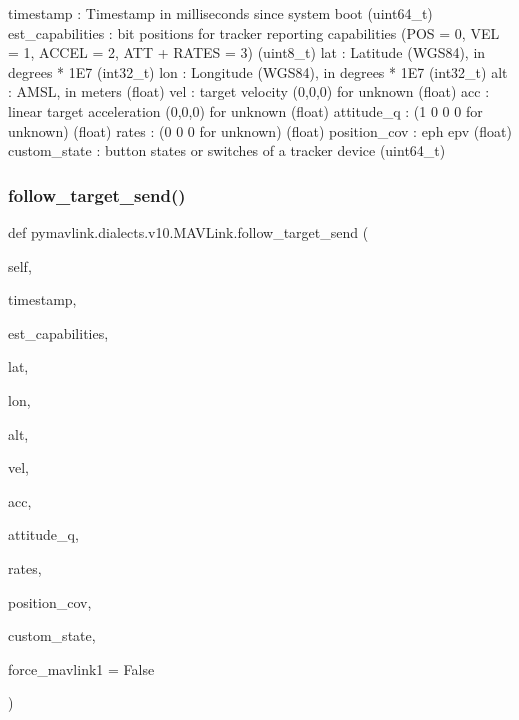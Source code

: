 \begin{DoxyVerb}
\begin{DoxyVerb}
\begin{DoxyVerb}
timestamp                 : Timestamp in milliseconds since system boot (uint64_t)
est_capabilities          : bit positions for tracker reporting capabilities (POS = 0, VEL = 1, ACCEL = 2, ATT + RATES = 3) (uint8_t)
lat                       : Latitude (WGS84), in degrees * 1E7 (int32_t)
lon                       : Longitude (WGS84), in degrees * 1E7 (int32_t)
alt                       : AMSL, in meters (float)
vel                       : target velocity (0,0,0) for unknown (float)
acc                       : linear target acceleration (0,0,0) for unknown (float)
attitude_q                : (1 0 0 0 for unknown) (float)
rates                     : (0 0 0 for unknown) (float)
position_cov              : eph epv (float)
custom_state              : button states or switches of a tracker device (uint64_t)\end{DoxyVerb}
 \mbox{\label{classpymavlink_1_1dialects_1_1v10_1_1MAVLink_a88c2ba5a0d97e7b3c71a6b03182d6f1a}} 
\subsubsection{\texorpdfstring{follow\+\_\+target\+\_\+send()}{follow\_target\_send()}}
{\footnotesize\ttfamily def pymavlink.\+dialects.\+v10.\+M\+A\+V\+Link.\+follow\+\_\+target\+\_\+send (\begin{DoxyParamCaption}\item[{}]{self,  }\item[{}]{timestamp,  }\item[{}]{est\+\_\+capabilities,  }\item[{}]{lat,  }\item[{}]{lon,  }\item[{}]{alt,  }\item[{}]{vel,  }\item[{}]{acc,  }\item[{}]{attitude\+\_\+q,  }\item[{}]{rates,  }\item[{}]{position\+\_\+cov,  }\item[{}]{custom\+\_\+state,  }\item[{}]{force\+\_\+mavlink1 = {\ttfamily False} }\end{DoxyParamCaption})}


\end{DoxyVerb}
\end{DoxyVerb}
